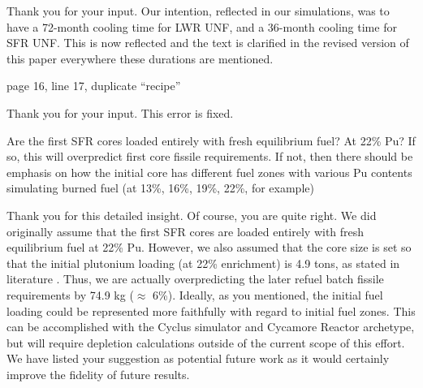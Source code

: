 \documentclass[answers,11pt]{exam}
\begin{document}
\begin{questions}
        \begin{solution}
                Thank you for your input. Our intention, reflected in our 
                simulations, was to have a 72-month
                cooling time for LWR UNF, and a 36-month cooling time for SFR UNF.
                This is now reflected and the text is clarified in the revised version of
                this paper everywhere these durations are mentioned.
        \end{solution}

        \question page 16, line 17, duplicate ``recipe''
        \begin{solution}
                Thank you for your input. This error is fixed.
        \end{solution}

        \question Are the first SFR cores loaded entirely with fresh 
        equilibrium fuel? At 22\% Pu?  If so, this will overpredict first core 
        fissile requirements. If not, then there should be emphasis on how the 
        initial core has different fuel zones with various Pu contents 
        simulating burned fuel (at 13\%, 16\%, 19\%, 22\%, for example)

        \begin{solution}
                Thank you for this detailed insight. Of course, you are quite right. 
                We did originally assume
                that the first SFR cores are loaded entirely with
                fresh equilibrium fuel at 22\% Pu. However, we also assumed
                that the core size is set so that the initial plutonium
                loading (at 22\% enrichment) is 4.9 tons, as stated in
                literature \cite{chenaud_status_2013}. Thus, we are
                actually overpredicting the later refuel batch fissile
                requirements by 74.9 kg ($\approx$ 6\%). 
                Ideally, as you mentioned, the initial fuel loading
                could be represented more faithfully with regard to initial
                fuel zones.
                This can be accomplished with the Cyclus simulator 
                and Cycamore Reactor archetype, but will require depletion 
                calculations outside of the current scope of this effort. We 
                have listed your suggestion as potential future work as it 
                would certainly improve the fidelity of future results.     
        \end{solution}



\end{questions}
\end{document}
